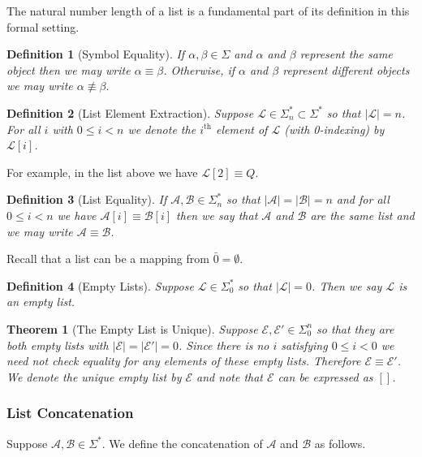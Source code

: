 \documentclass[12pt]{article}
\theoremstyle{break}
\newtheorem{definition}{Definition}[section]
\theoremstyle{break}
\newtheorem{theorem}{Theorem}[section]
\theoremstyle{break}
\theoremstyle{break}
\theoremstyle{break}
\newtheorem{informal definition}[definition]{Informal Definition}
\newcommand{\mc}[1]{\mathcal{#1}}
\begin{document}
The natural number length of a list is a fundamental part of its definition in this formal setting.

\begin{definition}[Symbol Equality]
If $\alpha, \beta \in \Sigma$ and $\alpha$ and $\beta$ represent the same object then we may write $\alpha \equiv \beta$.
Otherwise, if $\alpha$ and $\beta$ represent different objects we may write $\alpha \not \equiv \beta$.
\end{definition}

\begin{definition}[List Element Extraction]
Suppose $\mc{L}\in\Sigma_n^*\subset \Sigma^*$ so that $|\mathcal{L}| = n$.
For all $i$ with $0 \le i < n$ we denote the $i^{\text{th}}$ element of $\mc{L}$ (with 0-indexing) by $\mc{L}[i]$.
\end{definition}

For example, in the list above we have $\mc{L}[2] \equiv Q$.

\begin{definition}[List Equality]
If $\mc{A}, \mc{B}\in\Sigma_n^*$ so that $|\mc{A}| = |\mc{B}| = n$ and for all $0 \le i < n$ we have $\mc{A}[i] \equiv \mc{B}[i]$ then we say that $\mc{A}$ and $\mc{B}$ are the same list and we may write $\mc{A} \equiv \mc{B}$.
\end{definition}

Recall that a list can be a mapping from $\bar{0} = \emptyset$.

\begin{definition}[Empty Lists]
Suppose $\mc{L}\in\Sigma_0^*$ so that $|\mc{L}|=0$.
Then we say $\mc{L}$ is an empty list.
\end{definition}

\begin{theorem}[The Empty List is Unique]
Suppose $\mc{E}, \mc{E}' \in \Sigma_0^n$ so that they are both empty lists with $|\mc{E}| = |\mc{E}'| = 0 $.
Since there is no $i$ satisfying $0\le i < 0$ we need not check equality for any elements of these empty lists.
Therefore $\mc{E} \equiv \mc{E}'$.
We denote the unique empty list by $\mc{E}$ and note that $\mc{E}$ can be expressed as $[]$.
\end{theorem}

\subsubsection{List Concatenation}
Suppose $\mc{A}, \mc{B}\in\Sigma^*$.
We define the concatenation of $\mc{A}$ and $\mc{B}$ as follows.
\end{document}
